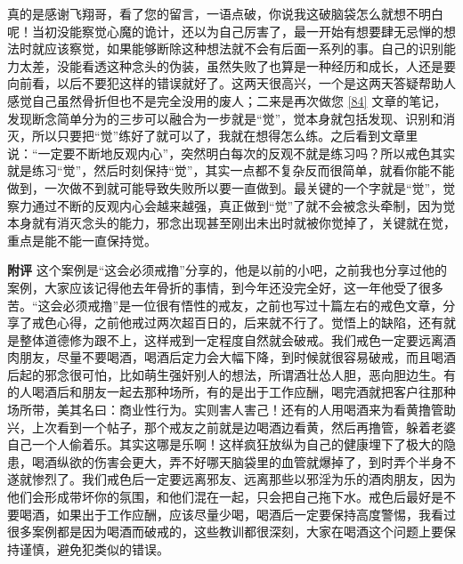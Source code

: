 \begin{case}
    真的是感谢飞翔哥，看了您的留言，一语点破，你说我这破脑袋怎么就想不明白呢！当初没能察觉心魔的诡计，还以为自己厉害了，最一开始有想要肆无忌惮的想法时就应该察觉，如果能够断除这种想法就不会有后面一系列的事。自己的识别能力太差，没能看透这种念头的伪装，虽然失败了也算是一种经历和成长，人还是要向前看，以后不要犯这样的错误就好了。这两天很高兴，一个是这两天答疑帮助人感觉自己虽然骨折但也不是完全没用的废人；二来是再次做您 \ref{84} 文章的笔记，发现断念简单分为的三步可以融合为一步就是“觉”，觉本身就包括发现、识别和消灭，所以只要把“觉”练好了就可以了，我就在想得怎么练。之后看到文章里说：“一定要不断地反观内心”，突然明白每次的反观不就是练习吗？所以戒色其实就是练习“觉”，然后时刻保持“觉”，其实一点都不复杂反而很简单，就看你能不能做到，一次做不到就可能导致失败所以要一直做到。最关键的一个字就是“觉”，觉察力通过不断的反观内心会越来越强，真正做到“觉”了就不会被念头牵制，因为觉本身就有消灭念头的能力，邪念出现甚至刚出未出时就被你觉掉了，关键就在觉，重点是能不能一直保持觉。

    \textbf{附评} 这个案例是“这会必须戒撸”分享的，他是以前的小吧，之前我也分享过他的案例，大家应该记得他去年骨折的事情，到今年还没完全好，这一年他受了很多苦。“这会必须戒撸”是一位很有悟性的戒友，之前也写过十篇左右的戒色文章，分享了戒色心得，之前他戒过两次超百日的，后来就不行了。觉悟上的缺陷，还有就是整体道德修为跟不上，这样戒到一定程度自然就会破戒。我们戒色一定要远离酒肉朋友，尽量不要喝酒，喝酒后定力会大幅下降，到时候就很容易破戒，而且喝酒后起的邪念很可怕，比如萌生强奸别人的想法，所谓酒壮怂人胆，恶向胆边生。有的人喝酒后和朋友一起去那种场所，有的是出于工作应酬，喝完酒就把客户往那种场所带，美其名曰：商业性行为。实则害人害己！还有的人用喝酒来为看黄撸管助兴，上次看到一个帖子，那个戒友之前就是边喝酒边看黄，然后再撸管，躲着老婆自己一个人偷着乐。其实这哪是乐啊！这样疯狂放纵为自己的健康埋下了极大的隐患，喝酒纵欲的伤害会更大，弄不好哪天脑袋里的血管就爆掉了，到时弄个半身不遂就惨烈了。我们戒色后一定要远离邪友、远离那些以邪淫为乐的酒肉朋友，因为他们会形成带坏你的氛围，和他们混在一起，只会把自己拖下水。戒色后最好是不要喝酒，如果出于工作应酬，应该尽量少喝，喝酒后一定要保持高度警惕，我看过很多案例都是因为喝酒而破戒的，这些教训都很深刻，大家在喝酒这个问题上要保持谨慎，避免犯类似的错误。


\end{case}
